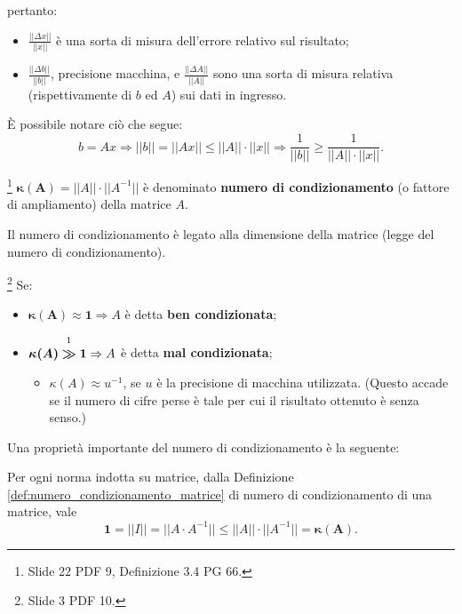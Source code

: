 pertanto:
\begin{itemize}
    \item $\frac{||\Delta x||}{||x||}$ è una sorta di misura dell'errore relativo sul risultato;
    \item $\frac{||\Delta b||}{||b||}$, precisione macchina, e $\frac{||\Delta A||}{||A||}$ sono una sorta di misura relativa (rispettivamente di $b$ ed $A$) sui dati in ingresso.
\end{itemize}

È possibile notare ciò che segue:
\begin{equation*}
    b=Ax\Rightarrow ||b||=||Ax||\leq ||A||\cdot||x||\Rightarrow\frac{1}{||b||}\geq \frac{1}{||A||\cdot||x||}.
\end{equation*}

\begin{definition}\label{def:numero_condizionamento_matrice} \footnote{Slide 22 PDF 9, Definizione 3.4 PG 66.}
    $\boldsymbol{\kappa(A)}=||A||\cdot||A^{-1}||$ è denominato \textbf{numero di condizionamento} (o fattore di ampliamento) della matrice $A$.
\end{definition}

Il numero di condizionamento è legato alla dimensione della matrice (legge del numero di condizionamento).

\begin{remark}\footnote{Slide 3 PDF 10.}
	Se:
	\begin{itemize}
		\item $\boldsymbol{\kappa(A)\approx 1}\Rightarrow A$ è detta \textbf{ben condizionata};
		\item $\boldsymbol{\kappa(A)}\overset{\footnotemark}{\boldsymbol\gg}\boldsymbol 1 \Rightarrow A$ è detta \textbf{mal condizionata};
		\begin{itemize}
			\item $\kappa(A)\approx u^{-1}$, se $u$ è la precisione di macchina utilizzata. (Questo accade se il numero di cifre perse è tale per cui il risultato ottenuto è senza senso.)
		\end{itemize}
	\end{itemize}
\end{remark}

Una proprietà importante del numero di condizionamento è la seguente:
\begin{remark}
	Per ogni norma indotta su matrice, dalla Definizione \ref{def:numero_condizionamento_matrice} di numero di condizionamento di una matrice, vale
	\begin{equation*}
		\boldsymbol 1 = ||I||=||A\cdot A^{-1}||\boldsymbol\leq ||A||\cdot||A^{-1}||=\boldsymbol{\kappa(A)}.
	\end{equation*}
\end{remark}

